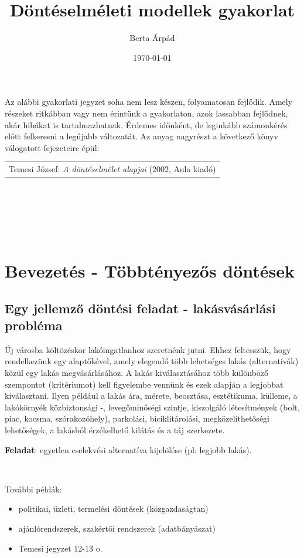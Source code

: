 \documentclass[a4paper,12pt]{article}
\author{Berta Árpád}
\title{Döntéselméleti modellek gyakorlat}
\date{\today}
\begin{document}
\maketitle

Az alábbi gyakorlati jegyzet soha nem lesz készen, folyamatosan fejlődik. Amely részeket ritkábban vagy nem érintünk a gyakorlaton, azok lassabban fejlődnek, akár hibákat is tartalmazhatnak. Érdemes időnként, de leginkább számonkérés előtt felkeresni a legújabb változatát. Az anyag nagyrészt a következő könyv válogatott fejezeteire épül: 

\begin{tabular}{c}
  Temesi József: \emph{A döntéselmélet alapjai} (2002, Aula kiadó)
\end{tabular}

\tableofcontents

\

\

\

\section{Bevezetés - Többtényezős döntések}

\subsection{Egy jellemző döntési feladat - lakásvásárlási probléma}

Új városba költözéskor lakóingatlanhoz szeretnénk jutni. Ehhez feltesszük, hogy rendelkezünk egy alaptőkével, amely elegendő több lehetséges lakás (alternatívák) közül egy lakás megvásárlásához. A lakás kiválasztásához több különböző szempontot (kritériumot) kell figyelembe vennünk és ezek alapján a legjobbat kiválasztani. Ilyen például a lakás ára, mérete, beosztása, esztétikuma, külleme, a lakókörnyék közbiztonsági -, levegőminőségi szintje, kiszolgáló létesítmények (bolt, piac, kocsma, szórakozóhely), parkolási, biciklitárolási, megközelíthetőségi lehetőségek, a lakásból érzékelhető kilátás és a táj szerkezete.

\textbf{Feladat}: egyetlen cselekvési alternatíva kijelölése (pl: legjobb lakás). 

\

További példák: 
\begin{itemize}
\item politikai, üzleti, termelési döntések (közgazdaságtan)
\item ajánlórendszerek, szakértői rendszerek (adatbányászat) 
\item Temesi jegyzet 12-13 o. 
\end{itemize}
\end{document}

